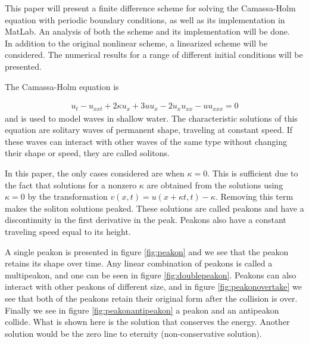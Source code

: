 This paper will present a finite difference scheme for solving the Camassa-Holm equation with periodic boundary conditions, as well as its implementation in MatLab. An analysis of both the scheme and its implementation will be done. \\
In addition to the original nonlinear scheme, a linearized scheme will be considered. The numerical results for a range of different initial conditions will be presented. 

The Camassa-Holm equation is

\begin{align}
u_{t} - u_{xxt} + 2\kappa u_{x} + 3uu_{x} - 2u_{x}u_{xx} - uu_{xxx} = 0
\end{align}
and is used to model waves in shallow water. The characteristic solutions of this equation are solitary waves of permanent shape, traveling at constant speed. If these waves can interact with other waves of the same type without changing their shape or speed, they are called solitons. 

In this paper, the only cases considered are when $\kappa = 0$. This is sufficient due to the fact that solutions for a nonzero $\kappa$ are obtained from the solutions using $\kappa = 0$ by the transformation $v(x,t) = u(x + \kappa t, t) - \kappa$. Removing this term makes the soliton solutions peaked. These solutions are called peakons and have a discontinuity in the first derivative in the peak. Peakons also have a constant traveling speed equal to its height.

A single peakon is presented in figure \ref{fig:peakon} and we see that the peakon retains its shape over time. Any linear combination of peakons is called a multipeakon, and one can be seen in figure \ref{fig:doublepeakon}. Peakons can also interact with other peakons of different size, and in figure \ref{fig:peakonovertake} we see that both of the peakons retain their original form after the collision is over. Finally we see in figure \ref{fig:peakonantipeakon} a peakon and an antipeakon collide. What is shown here is the solution that conserves the energy. Another solution would be the zero line to eternity (non-conservative solution).


